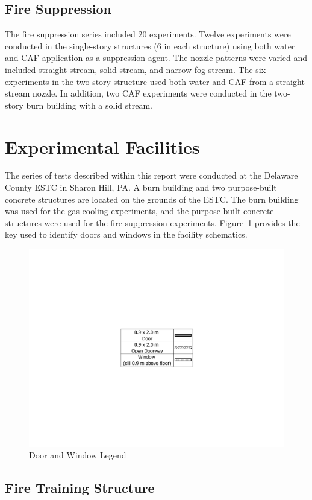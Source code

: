 \documentclass[12pt,oneside]{book}
\begin{document}
\subsection{Fire Suppression}
\label{sec:desc_Fire_Suppression}

The fire suppression series included 20 experiments. Twelve experiments were conducted in the single-story structures (6 in each structure) using both water and CAF application as a suppression agent. The nozzle patterns were varied and included straight stream, solid stream, and narrow fog stream. The six experiments in the two-story structure used both water and CAF from a straight stream nozzle.  In addition, two CAF experiments were conducted in the two-story burn building with a solid stream. 

\section{Experimental Facilities}
\label{sec:Experimental_Facility}

The series of tests described within this report were conducted at the Delaware County ESTC in Sharon Hill, PA. A burn building and two purpose-built concrete structures are located on the grounds of the ESTC. The burn building was used for the gas cooling experiments, and the purpose-built concrete structures were used for the fire suppression experiments. Figure~\ref{fig:Door_Status_Legend} provides the key used to identify doors and windows in the facility schematics.

\begin{figure}[!ht]
	\includegraphics[width=.35\columnwidth]{../Figures/Floor_Plans/PDFs/DelCo_2012_Door_Legend}
	\caption{Door and Window Legend}
	\label{fig:Door_Status_Legend}
\end{figure}

\subsection{Fire Training Structure}
\label{sec:Burn_Building}
\end{document}

